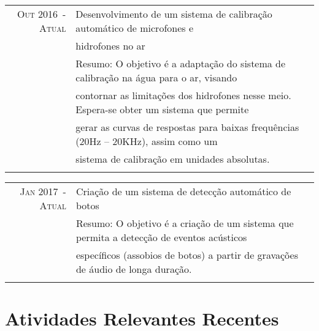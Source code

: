 \documentclass[a4paper,10pt]{article}
\begin{document}
\begin{tabular}{rl}


    \textsc{Out 2016~-~Atual}   & Desenvolvimento de um sistema de calibração automático de microfones e \\
                                & hidrofones no ar\\ 
                                &\footnotesize{Resumo: O objetivo é a adaptação do sistema de calibração na água para o ar, visando}\\ 
                                &\footnotesize{contornar as limitações dos hidrofones nesse meio. Espera-se obter um sistema que permite}\\ 
                                &\footnotesize{gerar as curvas de respostas para baixas frequências (20Hz – 20KHz), assim como um}\\ 
                                &\footnotesize{sistema de calibração em unidades absolutas.}\\
                                &\\
\end{tabular}
\begin{tabular}{rl}


    \textsc{Jan 2017~-~Atual}   & Criação de um sistema de detecção automático de botos\\
                                &\footnotesize{Resumo: O objetivo é a criação de um sistema que permita a detecção de eventos acústicos} \\ 
                                &\footnotesize{específicos (assobios de botos) a partir de gravações de áudio de longa duração.} \\
                                &\\
\end{tabular}

\section{Atividades Relevantes Recentes}
\end{document}
